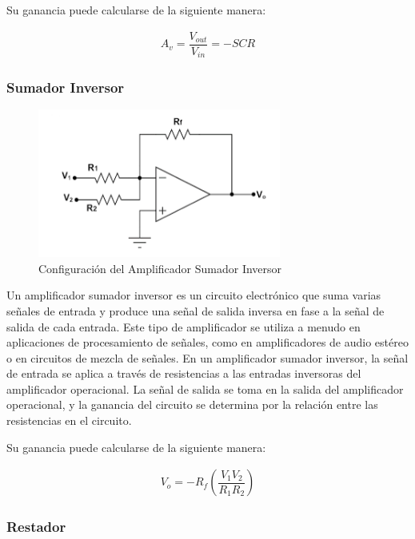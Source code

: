             
            Su ganancia puede calcularse de la siguiente manera:

            \begin{gather}
                  A_v=\dfrac{V_{out}}{V_{in}}=-SCR
             \end{gather}

        \subsubsection{Sumador Inversor}

            \begin{figure}[H]
                \centering
                \includegraphics[width=8cm]{Imagenes/sumador_inversor.png}
                \caption{Configuración del Amplificador Sumador Inversor}
                \label{fig:sumador_inversor}
            \end{figure}

            Un amplificador sumador inversor es un circuito electrónico que suma varias señales de entrada y produce una señal de salida inversa en fase a la señal de salida de cada entrada. Este tipo de amplificador se utiliza a menudo en aplicaciones de procesamiento de señales, como en amplificadores de audio estéreo o en circuitos de mezcla de señales. En un amplificador sumador inversor, la señal de entrada se aplica a través de resistencias a las entradas inversoras del amplificador operacional. La señal de salida se toma en la salida del amplificador operacional, y la ganancia del circuito se determina por la relación entre las resistencias en el circuito. 
            
            Su ganancia puede calcularse de la siguiente manera: 

            \begin{gather}
                V_o=-R_f\left(\dfrac{V_1V_2}{R_1R_2}\right)
            \end{gather}

        \subsubsection{Restador}


